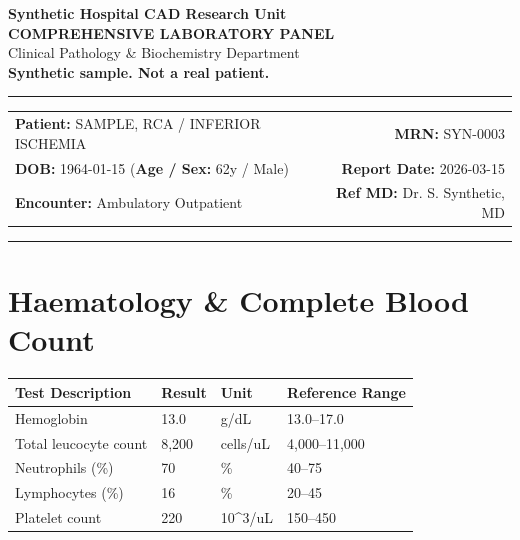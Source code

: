 \documentclass[10pt,a4paper]{article}
\begin{document}
\begin{center}
  {\Large \textbf{Synthetic Hospital CAD Research Unit}}\\
  \vspace{2pt}
  {\normalsize \textbf{COMPREHENSIVE LABORATORY PANEL}}\\
  \vspace{1pt}
  {\footnotesize \textcolor{subtext}{Clinical Pathology \& Biochemistry Department}}\\
  \vspace{4pt}
  {\small \textbf{\textcolor{red!75!black}{Synthetic sample. Not a real patient.}}}\\
  \vspace{3pt}
  \textcolor{linecolor}{\rule{\textwidth}{0.8pt}}
\end{center}

\vspace{2pt}

\noindent
\begin{tabular*}{\textwidth}{@{} l @{\extracolsep{\fill}} r @{}}
  \textbf{Patient:} SAMPLE, RCA / INFERIOR ISCHEMIA & \textbf{MRN:} SYN-0003 \\
  \textbf{DOB:} 1964-01-15 \quad (\textbf{Age / Sex:} 62y / Male) & \textbf{Report Date:} 2026-03-15 \\
  \textbf{Encounter:} Ambulatory Outpatient & \textbf{Ref MD:} Dr. S. Synthetic, MD \\
\end{tabular*}

\vspace{2pt}
\noindent\textcolor{linecolor}{\rule{\textwidth}{0.4pt}}
\vspace{6pt}


\section*{Haematology \& Complete Blood Count}

\begin{tabular}{@{} p{6.4cm} p{2.5cm} p{2.5cm} p{3.1cm} @{}}
  \toprule
  \textbf{Test Description} & \textbf{Result} & \textbf{Unit} & \textbf{Reference Range} \\
  \midrule
  Hemoglobin & 13.0 & g/dL & 13.0--17.0 \\
  Total leucocyte count & 8,200 & cells/uL & 4,000--11,000 \\
  Neutrophils (\%) & 70 & \% & 40--75 \\
  Lymphocytes (\%) & 16 & \% & 20--45 \\
  Platelet count & 220 & 10\textasciicircum 3/uL & 150--450 \\
  \bottomrule
\end{tabular}
\end{document}
